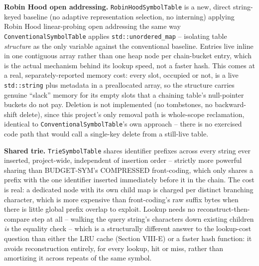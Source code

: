 \documentclass[conference]{IEEEtran}
\begin{document}
\textbf{Robin Hood open addressing.} \texttt{RobinHoodSymbolTable}
\cite{celis-robinhood} is a new, direct string-keyed baseline (no adaptive
representation selection, no interning) applying Robin Hood linear-probing
open addressing the same way \texttt{ConventionalSymbolTable} applies
\texttt{std::unordered\_map} -- isolating table \emph{structure} as the only
variable against the conventional baseline. Entries live inline in one
contiguous array rather than one heap node per chain-bucket entry, which
is the actual mechanism behind its lookup speed, not a faster hash. This
comes at a real, separately-reported memory cost: every slot, occupied or
not, is a live \texttt{std::string} plus metadata in a preallocated array,
so the structure carries genuine ``slack'' memory for its empty slots that
a chaining table's null-pointer buckets do not pay. Deletion is not
implemented (no tombstones, no backward-shift delete), since this project's
only removal path is whole-scope reclamation, identical to
\texttt{ConventionalSymbolTable}'s own approach -- there is no exercised
code path that would call a single-key delete from a still-live table.

\textbf{Shared trie.} \texttt{TrieSymbolTable} \cite{fredkin-trie} shares
identifier prefixes across every string ever inserted, project-wide,
independent of insertion order -- strictly more powerful sharing than
BUDGET-SYM's COMPRESSED front-coding, which only shares a prefix with the
one identifier inserted immediately before it in the chain. The cost is
real: a dedicated node with its own child map is charged per distinct
branching character, which is more expensive than front-coding's raw
suffix bytes when there is little global prefix overlap to exploit. Lookup
needs no reconstruct-then-compare step at all -- walking the query
string's characters down existing children \emph{is} the equality check --
which is a structurally different answer to the lookup-cost question than
either the LRU cache (Section VIII-E) or a faster hash function: it avoids
reconstruction entirely, for every lookup, hit or miss, rather than
amortizing it across repeats of the same symbol.
\end{document}
